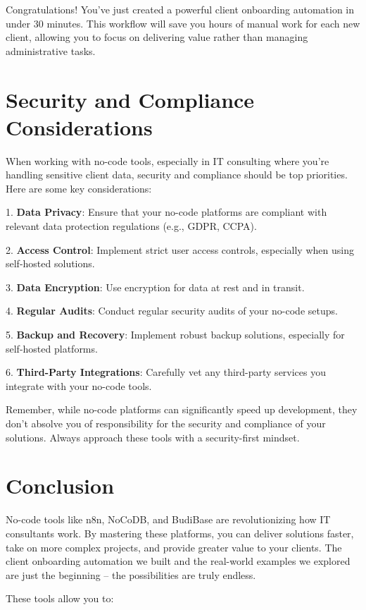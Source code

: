 Congratulations! You've just created a powerful client onboarding automation in under 30 minutes. This workflow will save you hours of manual work for each new client, allowing you to focus on delivering value rather than managing administrative tasks.


\section{Security and Compliance Considerations}

When working with no-code tools, especially in IT consulting where you're handling sensitive client data, security and compliance should be top priorities. Here are some key considerations:

1. \textbf{Data Privacy}: Ensure that your no-code platforms are compliant with relevant data protection regulations (e.g., GDPR, CCPA).

2. \textbf{Access Control}: Implement strict user access controls, especially when using self-hosted solutions.

3. \textbf{Data Encryption}: Use encryption for data at rest and in transit.

4. \textbf{Regular Audits}: Conduct regular security audits of your no-code setups.

5. \textbf{Backup and Recovery}: Implement robust backup solutions, especially for self-hosted platforms.

6. \textbf{Third-Party Integrations}: Carefully vet any third-party services you integrate with your no-code tools.

Remember, while no-code platforms can significantly speed up development, they don't absolve you of responsibility for the security and compliance of your solutions. Always approach these tools with a security-first mindset.


\section{Conclusion}

No-code tools like n8n, NoCoDB, and BudiBase are revolutionizing how IT consultants work. By mastering these platforms, you can deliver solutions faster, take on more complex projects, and provide greater value to your clients. The client onboarding automation we built and the real-world examples we explored are just the beginning – the possibilities are truly endless.

These tools allow you to:

